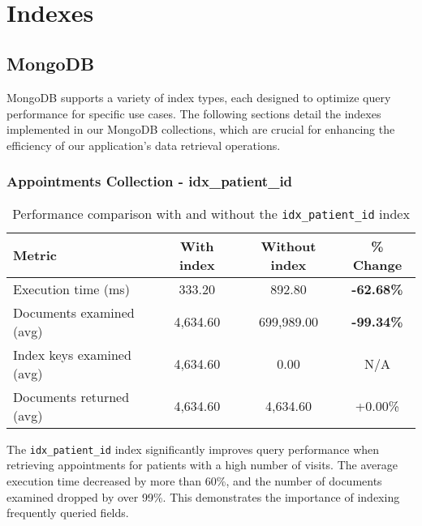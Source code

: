 \begin{lstlisting}[language=java]
	
\end{lstlisting}

\begin{lstlisting}[language=mongodb]
	
\end{lstlisting}

\section{Indexes}

\subsection{MongoDB}
MongoDB supports a variety of index types, each designed to optimize query performance for specific use cases. The following sections detail the indexes implemented in our MongoDB collections, which are crucial for enhancing the efficiency of our application's data retrieval operations.

\subsubsection{Appointments Collection - idx\_patient\_id}

\begin{table}[H]
\centering
\caption{Performance comparison with and without the \texttt{idx\_patient\_id} index}
\begin{tabular}{lccc}
\toprule
\textbf{Metric} & \textbf{With index} & \textbf{Without index} & \textbf{\% Change} \\
\midrule
Execution time (ms)         & 333.20     & 892.80     & \textbf{-62.68\%} \\
Documents examined (avg)         & 4,634.60   & 699,989.00 & \textbf{-99.34\%} \\
Index keys examined (avg)        & 4,634.60   & 0.00       & N/A \\
Documents returned (avg)         & 4,634.60   & 4,634.60   & +0.00\% \\
\bottomrule
\end{tabular}
\label{tab:patient_idx_performance_corrected}
\end{table}

The \texttt{idx\_patient\_id} index significantly improves query performance when retrieving appointments for patients with a high number of visits. The average execution time decreased by more than 60\%, and the number of documents examined dropped by over 99\%. This demonstrates the importance of indexing frequently queried fields.

